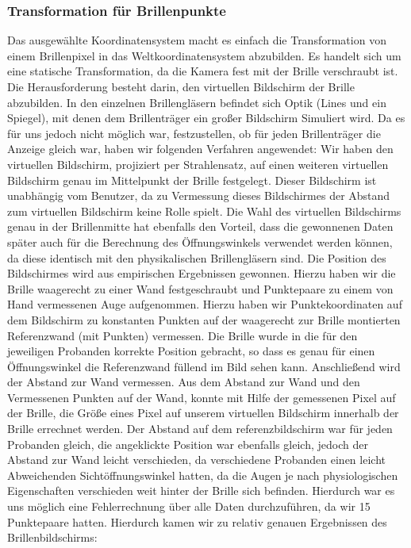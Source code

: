 \subsubsection{Transformation für Brillenpunkte}
Das ausgewählte Koordinatensystem macht es einfach die Transformation von einem Brillenpixel in das Weltkoordinatensystem abzubilden. Es handelt sich um eine statische Transformation, da die Kamera fest mit der Brille verschraubt ist. Die Herausforderung besteht darin, den virtuellen Bildschirm der Brille abzubilden. In den einzelnen Brillengläsern befindet sich Optik (Lines und ein Spiegel), mit denen dem Brillenträger ein großer Bildschirm Simuliert wird. Da es für uns jedoch nicht möglich war, festzustellen, ob für jeden Brillenträger die Anzeige gleich war, haben wir folgenden Verfahren angewendet: Wir haben den virtuellen Bildschirm, projiziert per Strahlensatz, auf einen weiteren virtuellen Bildschirm genau im Mittelpunkt der Brille festgelegt. Dieser Bildschirm ist unabhängig vom Benutzer, da zu Vermessung dieses Bildschirmes der Abstand zum virtuellen Bildschirm keine Rolle spielt.
Die Wahl des virtuellen Bildschirms genau in der Brillenmitte hat ebenfalls den Vorteil, dass die gewonnenen Daten später auch für die Berechnung des Öffnungswinkels verwendet werden können, da diese identisch mit den physikalischen Brillengläsern sind.
Die Position des Bildschirmes wird aus empirischen Ergebnissen gewonnen. Hierzu haben wir die Brille waagerecht zu einer Wand festgeschraubt und Punktepaare zu einem von Hand vermessenen Auge aufgenommen. Hierzu haben wir Punktekoordinaten auf dem Bildschirm zu konstanten Punkten auf der waagerecht zur Brille montierten Referenzwand (mit Punkten) vermessen. Die Brille wurde in die für den jeweiligen Probanden korrekte Position gebracht, so dass es genau für einen Öffnungswinkel die Referenzwand füllend im Bild sehen kann. Anschließend wird der Abstand zur Wand vermessen. Aus dem Abstand zur Wand und den Vermessenen Punkten auf der Wand, konnte mit Hilfe der gemessenen Pixel auf der Brille, die Größe eines Pixel auf unserem virtuellen Bildschirm innerhalb der Brille errechnet werden. Der Abstand auf dem referenzbildschirm war für jeden Probanden gleich, die angeklickte Position war ebenfalls gleich, jedoch der Abstand zur Wand leicht verschieden, da verschiedene Probanden einen leicht Abweichenden Sichtöffnungswinkel hatten, da die Augen je nach physiologischen Eigenschaften verschieden weit hinter der Brille sich befinden. Hierdurch war es uns möglich eine Fehlerrechnung über alle Daten durchzuführen, da wir 15 Punktepaare hatten. Hierdurch kamen wir zu relativ genauen Ergebnissen des Brillenbildschirms:
    
